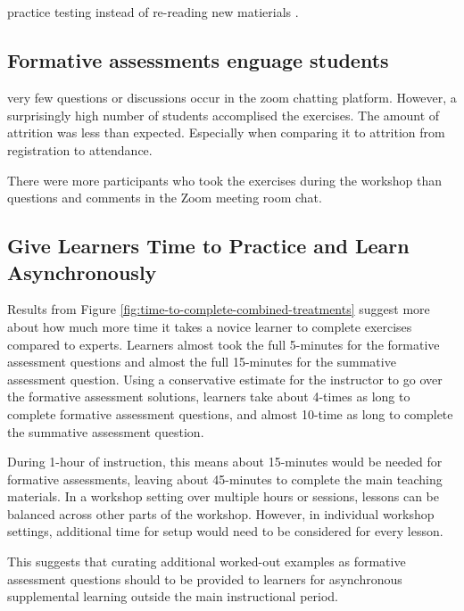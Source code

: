 \documentclass[040-assessment.tex]{subfiles}
\begin{document}
\subsection{}

    practice testing instead of re-reading new matierials
    \cite{dunloskyImprovingStudentsLearning2013}.

\subsection{Formative assessments enguage students}

    very few questions or discussions occur in the zoom chatting platform.
    However, a surprisingly high number of students accomplised the exercises.
    The amount of attrition was less than expected.
    Especially when comparing it to attrition from registration to attendance.

    There were more participants who took the exercises during the workshop than
    questions and comments in the Zoom meeting room chat.

\subsection{Give Learners Time to Practice and Learn Asynchronously}

    Results from Figure \ref{fig:time-to-complete-combined-treatments} suggest more about
    how much more time it takes a novice learner to complete exercises compared to experts.
    Learners almost took the full 5-minutes for the formative assessment questions and
    almost the full 15-minutes for the summative assessment question.
    Using a conservative estimate for the instructor to go over the formative assessment solutions,
    learners take about 4-times as long to complete formative assessment questions,
    and almost 10-time as long to complete the summative assessment question.

    During 1-hour of instruction, this means about 15-minutes would be needed for formative assessments,
    leaving about 45-minutes to complete the main teaching materials.
    In a workshop setting over multiple hours or sessions, lessons can be balanced across other parts of the workshop.
    However, in individual workshop settings, additional time for setup would need to be
    considered for every lesson.

    This suggests that curating additional worked-out examples as formative assessment questions
    should to be provided to learners
    for asynchronous supplemental learning outside the main instructional period.
\end{document}
